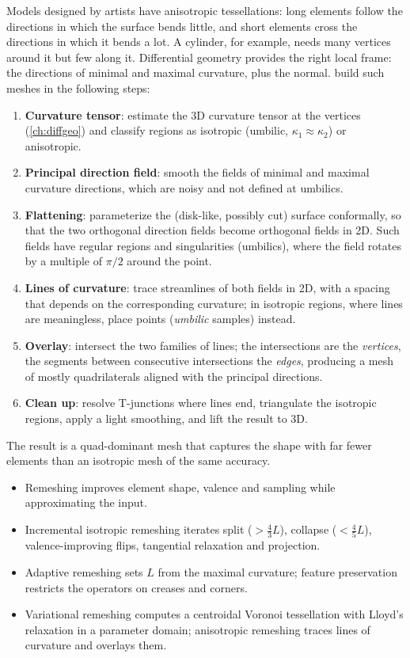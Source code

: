 Models designed by artists have anisotropic tessellations: long elements follow the directions in
which the surface bends little, and short elements cross the directions in which it bends a lot.
A cylinder, for example, needs many vertices around it but few along it. Differential geometry
provides the right local frame: the directions of minimal and maximal curvature, plus the normal.
 build such meshes in the following steps:
\begin{enumerate}
  \item \textbf{Curvature tensor}: estimate the 3D curvature tensor at the vertices
  (\cref{ch:diffgeo}) and classify regions as isotropic (umbilic, $\kappa_1\approx\kappa_2$) or
  anisotropic.
  \item \textbf{Principal direction field}: smooth the fields of minimal and maximal curvature
  directions, which are noisy and not defined at umbilics.
  \item \textbf{Flattening}: parameterize the (disk-like, possibly cut) surface conformally, so that
  the two orthogonal direction fields become orthogonal fields in 2D. Such fields have regular
  regions and singularities (umbilics), where the field rotates by a multiple of $\pi/2$ around the
  point.
  \item \textbf{Lines of curvature}: trace streamlines of both fields in 2D, with a spacing that
  depends on the corresponding curvature; in isotropic regions, where lines are meaningless,
  place points (\emph{umbilic} samples) instead.
  \item \textbf{Overlay}: intersect the two families of lines; the intersections are the
  \emph{vertices}, the segments between consecutive intersections the \emph{edges}, producing a
  mesh of mostly quadrilaterals aligned with the principal directions.
  \item \textbf{Clean up}: resolve T-junctions where lines end, triangulate the isotropic regions,
  apply a light smoothing, and lift the result to 3D.
\end{enumerate}
The result is a quad-dominant mesh that captures the shape with far fewer elements than an
isotropic mesh of the same accuracy.

\begin{keypoints}
\begin{itemize}[leftmargin=*]
  \item Remeshing improves element shape, valence and sampling while approximating the input.
  \item Incremental isotropic remeshing iterates split ($>\tfrac43L$), collapse ($<\tfrac45L$),
  valence-improving flips, tangential relaxation and projection.
  \item Adaptive remeshing sets $L$ from the maximal curvature; feature preservation restricts the
  operators on creases and corners.
  \item Variational remeshing computes a centroidal Voronoi tessellation with Lloyd's relaxation in
  a parameter domain; anisotropic remeshing traces lines of curvature and overlays them.
\end{itemize}
\end{keypoints}

